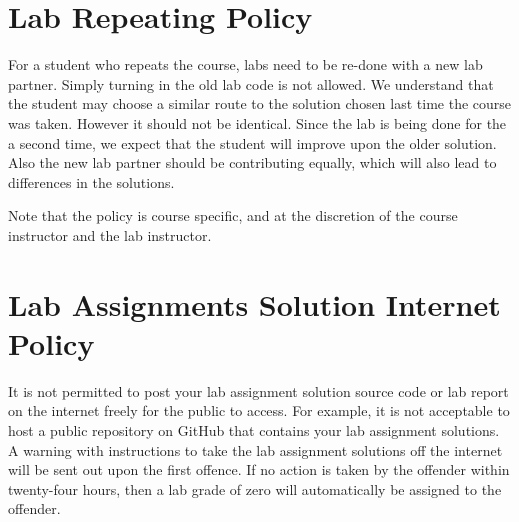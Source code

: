 \section*{Lab Repeating Policy}
For a student who repeats the course, labs need to be re-done with a new lab partner. 
Simply turning in the old lab code is not allowed. 
We understand that the student may choose a similar route to the solution chosen last time 
the course was taken. However it should not be identical. Since the lab is being done for the a second time,
we expect that the student will improve upon the older solution. Also the new lab partner should be 
contributing equally, which will also lead to differences in the solutions. 

Note that the policy is course specific, and at the discretion of the course instructor and the lab instructor.

\section*{Lab Assignments Solution Internet Policy} 
It is not permitted to post your lab assignment solution source code or lab report on the internet freely for the public to access. For example, it is not acceptable to host a public repository on GitHub that contains your lab assignment solutions. A warning with instructions to take the lab assignment solutions off the internet will be sent out upon the first offence. If no action is taken by the offender within twenty-four hours, then a lab grade of zero will automatically be assigned to the offender.
    
